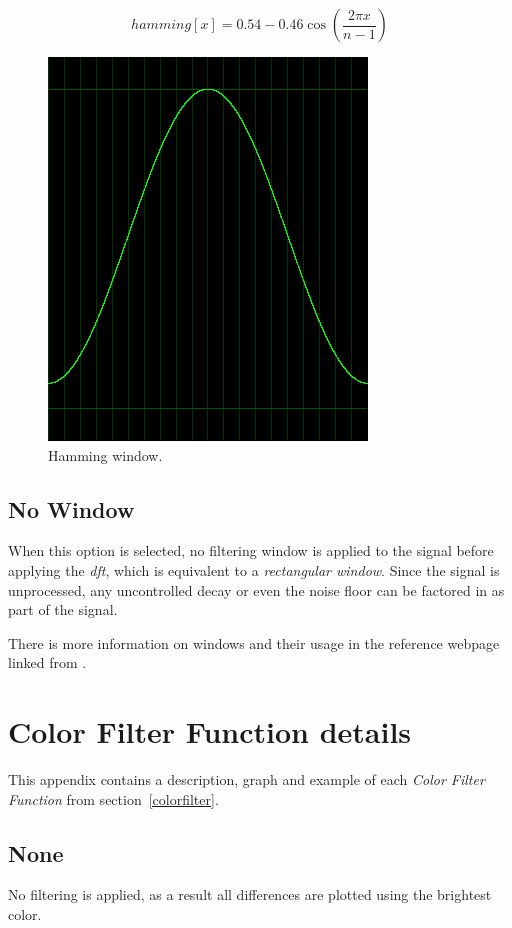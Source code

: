 \documentclass[10pt,a4paper]{report}
\newcommand{\ac}[1]{\textit{\mbox{\acrshort{#1}}}}
\begin{document}
\begin{appendices}
\begin{equation}
hamming[x] = 0.54 - 0.46\cos(\frac{2\pi x}{n-1})
\end{equation}

\begin{figure}[H]
	\centering
	\includegraphics[width=0.4\linewidth]{images/windows/window-hamming.png}
	\caption[Hamming window]{Hamming window.}
	\label{fig:window-hamming}
\end{figure}

\section{No Window}

When this option is selected, no filtering window is applied to the signal before applying the \ac{dft}, which is equivalent to a \textit{rectangular window}. Since the signal is unprocessed, any uncontrolled decay or even the noise floor can be factored in as part of the signal.

There is more information on windows and their usage in the reference webpage linked from \cite{windowtypes}.

\chapter{Color Filter Function details}
\label{filterfunctions}

This appendix contains a description, graph and example of each \textit{Color Filter Function} from section~\ref{colorfilter}.

\section{None} 

No filtering is applied, as a result all differences are plotted using the brightest color. 


\end{appendices}
\end{document}
